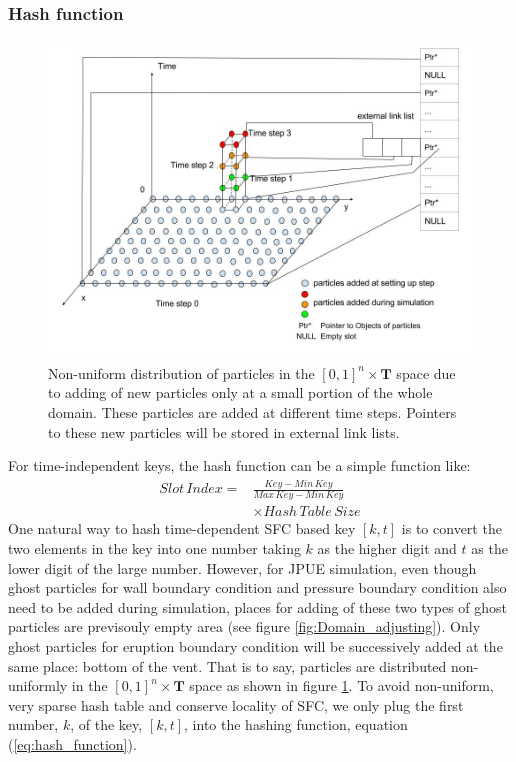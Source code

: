 \documentclass[conference,compsoc]{IEEEtran}
\begin{document}
\subsubsection{Hash function}
\begin{figure}[!t]
\centering
\includegraphics[scale=0.255]{Particle_adding_with_link}
\caption{Non-uniform distribution of particles in the $[0,1]^n \times \textbf{T}$ space due to adding of new particles only at a small portion of the whole domain. These particles are added at different time steps. Pointers to these new particles will be stored in external link lists.}
\label{fig:Particle_adding_with_link}
\end{figure}
For time-independent keys, the hash function can be a simple function like:
\begin{equation}
\label{eq:hash_function}
\begin{split}
Slot\,Index= &\frac{Key - Min\,Key}{Max\,Key - Min\,Key} \\
& \times Hash\,Table\,Size 
\end{split}
\end{equation}
One natural way to hash time-dependent SFC based key $[k,t]$ is to convert the two elements in the key into one number taking $k$ as the higher digit and $t$ as the lower digit of the large number. However, for JPUE simulation, even though ghost particles for wall boundary condition and pressure boundary condition also need to be added during simulation, places for adding of these two types of ghost particles are previsouly empty area (see figure \ref{fig:Domain_adjusting}). Only ghost particles for eruption boundary condition will be successively added at the same place: bottom of the vent. That is to say, particles are distributed non-uniformly in the $[0,1]^n \times \textbf{T}$ space as shown in figure \ref{fig:Particle_adding_with_link}. To avoid non-uniform, very sparse hash table and conserve locality of SFC, we only plug the first number, $k$, of the key, $[k,t]$, into the hashing function, equation (\ref{eq:hash_function}). 
\end{document}
